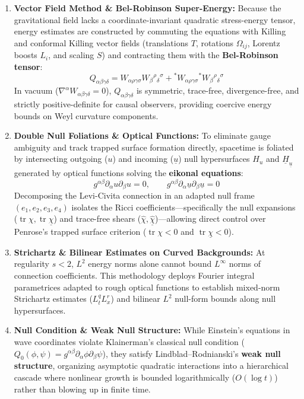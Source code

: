 \documentclass[11pt, a4paper]{article}
\begin{document}
\begin{enumerate}
    \item \textbf{Vector Field Method \& Bel-Robinson Super-Energy:} Because the gravitational field lacks a coordinate-invariant quadratic stress-energy tensor, energy estimates are constructed by commuting the equations with Killing and conformal Killing vector fields (translations $T$, rotations $\Omega_{ij}$, Lorentz boosts $L_i$, and scaling $S$) and contracting them with the \textbf{Bel-Robinson tensor}:
    \begin{equation}
        Q_{\alpha\beta\gamma\delta} = W_{\alpha\rho\gamma\sigma} W_\beta{}^\rho{}_\delta{}^\sigma + {}^*W_{\alpha\rho\gamma\sigma} {}^*W_\beta{}^\rho{}_\delta{}^\sigma
    \end{equation}
    In vacuum ($\nabla^\alpha W_{\alpha\beta\gamma\delta} = 0$), $Q_{\alpha\beta\gamma\delta}$ is symmetric, trace-free, divergence-free, and strictly positive-definite for causal observers, providing coercive energy bounds on Weyl curvature components.

    \item \textbf{Double Null Foliations \& Optical Functions:} To eliminate gauge ambiguity and track trapped surface formation directly, spacetime is foliated by intersecting outgoing ($u$) and incoming ($\underline{u}$) null hypersurfaces $H_u$ and $\underline{H}_{\underline{u}}$ generated by optical functions solving the \textbf{eikonal equations}:
    \begin{equation}
        g^{\alpha\beta}\partial_\alpha u \partial_\beta u = 0, \qquad g^{\alpha\beta}\partial_\alpha \underline{u} \partial_\beta \underline{u} = 0
    \end{equation}
    Decomposing the Levi-Civita connection in an adapted null frame $(e_1, e_2, e_3, e_4)$ isolates the Ricci coefficients---specifically the null expansions ($\operatorname{tr}\chi, \operatorname{tr}\underline{\chi}$) and trace-free shears ($\hat{\chi}, \underline{\hat{\chi}}$)---allowing direct control over Penrose's trapped surface criterion ($\operatorname{tr}\chi < 0$ and $\operatorname{tr}\underline{\chi} < 0$).

    \item \textbf{Strichartz \& Bilinear Estimates on Curved Backgrounds:} At regularity $s < 2$, $L^2$ energy norms alone cannot bound $L^\infty$ norms of connection coefficients. This methodology deploys Fourier integral parametrices adapted to rough optical functions to establish mixed-norm Strichartz estimates ($L^q_t L^r_x$) and bilinear $L^2$ null-form bounds along null hypersurfaces.

    \item \textbf{Null Condition \& Weak Null Structure:} While Einstein's equations in wave coordinates violate Klainerman's classical null condition ($Q_0(\phi,\psi) = g^{\alpha\beta}\partial_\alpha\phi\partial_\beta\psi$), they satisfy Lindblad--Rodnianski's \textbf{weak null structure}, organizing asymptotic quadratic interactions into a hierarchical cascade where nonlinear growth is bounded logarithmically ($O(\log t)$) rather than blowing up in finite time.
\end{enumerate}
\end{document}
